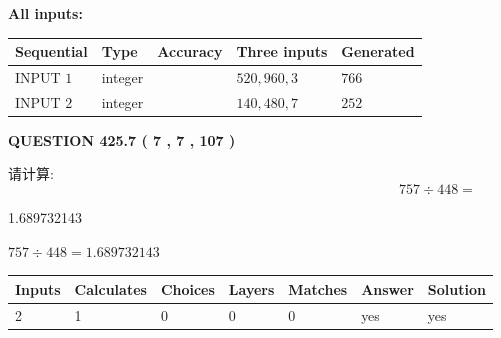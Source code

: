 \documentclass{ctexart}
\begin{document}
   
   
   
\noindent\vspace{0.1in}\hspace{-0.08in} {\textbf{\Large{All inputs: }}}
   
   
  
  
\noindent\begin{tabular}{|l|l|l|l|l|}
\hline
 Sequential & Type & Accuracy & Three inputs & Generated \\ 
\hline
 
 
  INPUT $  1 $ & integer &  & $
 520
 , 
 960
 , 
 3
 $ & $ 766 $ 
 \\  \hline  
 
 
  INPUT $  2 $ & integer &  & $
 140
 , 
 480
 , 
 7
 $ & $ 252 $ 
 \\  \hline  
 \end{tabular}
   
   
  
\vspace{0.2in}
  
{\textbf{\Large{QUESTION
425.7 
 ( 7 , 7 , 107 )
}}}
  
  
 
请计算:
\begin{equation}
757  \div    %
448 = \nonumber
\end{equation}
 
 
 
\noindent{}
 
 

1.689732143
 
 
\noindent{}
 
 

 
 
 
\noindent{}
 
 

$ %
757 \div  %
448=   %
1.689732143$
 
 
\noindent{}
 
 

 
   
   
   
   
\noindent\begin{tabular}{|l|l|l|l|l|l|l|}
 \hline
Inputs & Calculates & Choices & Layers & Matches & Answer & Solution \\ \hline
 2  & 
 1  & 
 0
  & 
 0  & 
 0  & 
  yes & 
  yes 
  \\ \hline
 \end{tabular}
   
\end{document}
